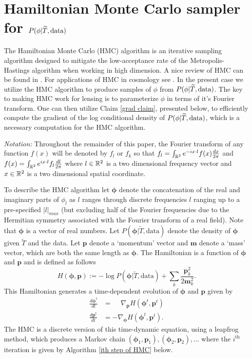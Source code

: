\documentclass[iop,revtex4,apj,onecolumn]{emulateapj}
\newcommand{\bs}{\boldsymbol}
\begin{document}
%
%
\section{Hamiltonian Monte Carlo sampler for $P(\phi | \widetilde T,  \text{\rm data})$}
\label{Section: hamiltonian sampler section}


The Hamiltonian Monte Carlo (HMC) algorithm is an iterative sampling algorithm designed to mitigate the low-acceptance rate of the Metropolis-Hastings algorithm when working in high dimension. 
A nice review of HMC can be found in \cite{neal2011mcmc}. For applications of HMC in cosmology see \cite{PhysRevD.75.083525, taylor2008fast, elsner2010local, 2010MNRAS.409..355J, 2012MNRAS.425.1042J, jasche2013bayesian, jasche2013methods}. In the present case we utilize the HMC algorithm to produce samples of $\phi$ from $P(\phi | \widetilde T,  \text{\rm data})$.  The key to making HMC work for lensing is to parameterize  $\phi$ in terms of it's Fourier transform. One can then utilize  Claim \ref{grad claim}, presented below, to efficiently compute the gradient of the log conditional density of $P(\phi | \widetilde T,  \text{\rm data})$, which is a necessary computation for the HMC algorithm.

{\em Notation:} Throughout the remainder of this paper, the Fourier transform of any function $f(x)$ will be denoted by $f_l$ or $f_k$ so that $f_l  =  \int_{\Bbb R^2} e^{-i x\cdot l}  f(x)\frac{dx}{2\pi}$ and
$f(x) =  \int_{\Bbb R^2} e^{i x\cdot l}  f_l \frac{dl}{2\pi}$ 
where $l\in \Bbb R^2$ is a two dimensional frequency vector and $x\in \Bbb R^2$  is a two dimensional spatial coordinate.


To describe the HMC algorithm let $\bs \phi$ denote the concatenation of the real and imaginary parts of $\phi_l$ as $l$ ranges through discrete frequencies $l$ ranging up to a pre-specified $|l|_{max}$ (but excluding  half of the Fourier frequencies due to the Hermitian symmetry associated with the Fourier transform of a real field). Note that $\bs \phi$ is a vector of real numbers. 
Let $P(\bs \phi|\widetilde T, \text{data})$ denote the density of $\bs \phi$ given $\widetilde T$ and the data. 
Let $\bs p$ denote a `momentum' vector and $\bs m$ denote a `mass' vector, which are both the same length as $\bs \phi$. The Hamiltonian is a function of $\bs \phi$ and $\bs p$ and is defined as follows
\[ H(\bs \phi, \bs p):= -\log P(\bs \phi|\widetilde T, \text{data})+\sum_k \frac{\bs p_k^2}{2\bs m_k^2}. \]
This Hamiltonian generates a time-dependent evolution of $\bs \phi$ and $\bs p$ given by 
\begin{align*}
\frac{d\bs \phi^t}{dt} &= \phantom{-}\nabla_{\bs p} H(\bs \phi^t, \bs p^t) \\
\frac{d\bs p^t}{dt}    &= -\nabla_{\bs \phi} H(\bs \phi^t, \bs p^t).
\end{align*} 
The HMC is a discrete version of  this time-dynamic equation, using a leapfrog method, which produces a Markov chain $(\bs \phi_1, \bs p_1), (\bs \phi_2, \bs p_2), \ldots$ where the $i^\text{th}$ iteration is given by Algorithm \ref{ith step of HMC} below.
\end{document}
